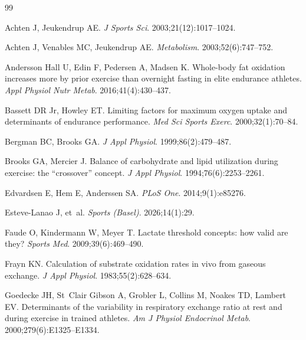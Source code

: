 \documentclass[10pt,a4paper]{article}
\begin{document}
\begin{thebibliography}{99}
\small

Achten J, Jeukendrup AE.
\newblock \emph{J Sports Sci}. 2003;21(12):1017--1024.

Achten J, Venables MC, Jeukendrup AE.
\newblock \emph{Metabolism}. 2003;52(6):747--752.

Andersson Hall U, Edin F, Pedersen A, Madsen K.
\newblock Whole-body fat oxidation increases more by prior exercise than overnight
  fasting in elite endurance athletes.
\newblock \emph{Appl Physiol Nutr Metab}. 2016;41(4):430--437.

Bassett DR Jr, Howley ET.
\newblock Limiting factors for maximum oxygen uptake and determinants of endurance
  performance.
\newblock \emph{Med Sci Sports Exerc}. 2000;32(1):70--84.

Bergman BC, Brooks GA.
\newblock \emph{J Appl Physiol}. 1999;86(2):479--487.

Brooks GA, Mercier J.
\newblock Balance of carbohydrate and lipid utilization during exercise: the
  ``crossover'' concept.
\newblock \emph{J Appl Physiol}. 1994;76(6):2253--2261.

Edvardsen E, Hem E, Anderssen SA.
\newblock \emph{PLoS One}. 2014;9(1):e85276.

Esteve-Lanao J, et~al.
\newblock \emph{Sports (Basel)}. 2026;14(1):29.

Faude O, Kindermann W, Meyer T.
\newblock Lactate threshold concepts: how valid are they?
\newblock \emph{Sports Med}. 2009;39(6):469--490.

Frayn KN.
\newblock Calculation of substrate oxidation rates in vivo from gaseous exchange.
\newblock \emph{J Appl Physiol}. 1983;55(2):628--634.

Goedecke JH, St~Clair Gibson A, Grobler L, Collins M, Noakes TD, Lambert EV.
\newblock Determinants of the variability in respiratory exchange ratio at rest and during
  exercise in trained athletes.
\newblock \emph{Am J Physiol Endocrinol Metab}. 2000;279(6):E1325--E1334.


\end{thebibliography}
\end{document}
